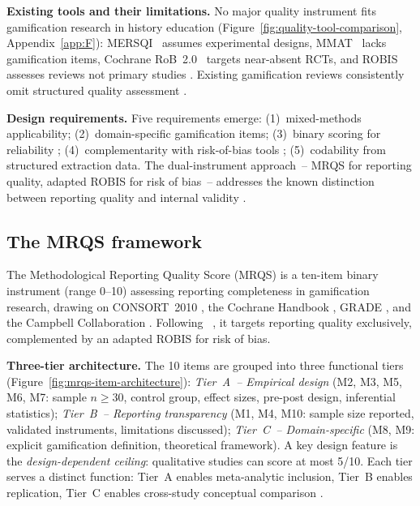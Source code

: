 \textbf{Existing tools and their limitations.} No major quality instrument fits gamification research in history education (Figure~\ref{fig:quality-tool-comparison}, Appendix~\ref{app:F}): MERSQI~\cite{ReedBeckman2007, CookReed2015} assumes experimental designs, MMAT~\cite{Hong2018} lacks gamification items, Cochrane RoB~2.0~\cite{HigginsThomas2019} targets near-absent RCTs, and ROBIS~\cite{Whiting2016} assesses reviews not primary studies \cite{Zeng2015}. Existing gamification reviews consistently omit structured quality assessment \cite{DichevDicheva2017, KoivistoHamari2019, SailerHomner2020, Korniienko2025mrqs}.

\textbf{Design requirements.} Five requirements emerge: (1)~mixed-methods applicability; (2)~domain-specific gamification items; (3)~binary scoring for reliability \cite{CookReed2015}; (4)~complementarity with risk-of-bias tools \cite{Whiting2016}; (5)~codability from structured extraction data. The dual-instrument approach~-- MRQS for reporting quality, adapted ROBIS for risk of bias~-- addresses the known distinction between reporting quality and internal validity \cite{Schulz2010CONSORT, Zeng2015}.

\subsection{The MRQS framework} \label{sec:mrqs-framework}

The Methodological Reporting Quality Score (MRQS) \cite{Korniienko2025mrqs} is a ten-item binary instrument (range 0--10) assessing reporting completeness in gamification research, drawing on CONSORT~2010 \cite{Schulz2010CONSORT}, the Cochrane Handbook \cite{HigginsThomas2019}, GRADE \cite{GuyattGRADE2008}, and the Campbell Collaboration \cite{Campbell2020}. Following \citeauthor{MaWang2020}~\cite{MaWang2020}, it targets reporting quality exclusively, complemented by an adapted ROBIS for risk of bias.

\textbf{Three-tier architecture.} The 10 items are grouped into three functional tiers (Figure~\ref{fig:mrqs-item-architecture}): \textit{Tier~A~-- Empirical design} (M2, M3, M5, M6, M7: sample $n \geq 30$, control group, effect sizes, pre-post design, inferential statistics); \textit{Tier~B~-- Reporting transparency} (M1, M4, M10: sample size reported, validated instruments, limitations discussed); \textit{Tier~C~-- Domain-specific} (M8, M9: explicit gamification definition, theoretical framework). A key design feature is the \emph{design-dependent ceiling}: qualitative studies can score at most 5/10. Each tier serves a distinct function: Tier~A enables meta-analytic inclusion, Tier~B enables replication, Tier~C enables cross-study conceptual comparison \cite{Cohen1960, Schulz2010CONSORT, Borenstein2009, Deterding2011, Buckley2018}.

